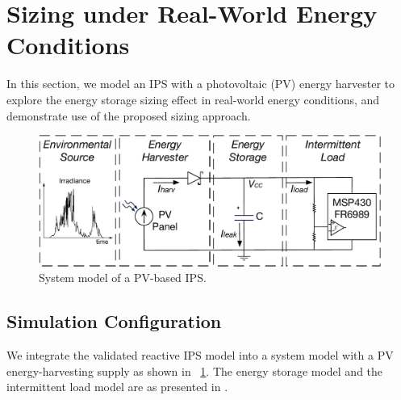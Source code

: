 \section{Sizing under Real-World Energy Conditions} \label{sec:c4_demo}

In this section, we model an IPS with a photovoltaic (PV) energy harvester to explore the energy storage sizing effect in real-world energy conditions, and demonstrate use of the proposed sizing approach. 

\begin{figure}[!t]
    \centering
    \includegraphics[width=\columnwidth]{ch4_sizingapproach/figures/solarmodel4}
    \caption{System model of a PV-based IPS.}
    \label{fig:Model}
\end{figure}

\subsection{Simulation Configuration}

We integrate the validated reactive IPS model into a system model with a PV energy-harvesting supply as shown in \figurename{~\ref{fig:Model}}. 
The energy storage model and the intermittent load model are as presented in . 

